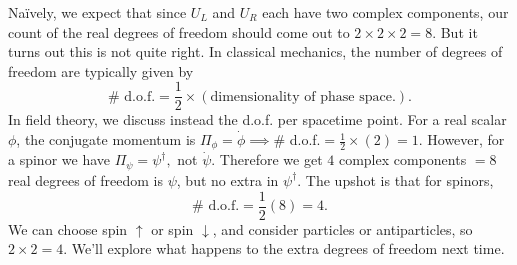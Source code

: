Na\"ively, we expect that since $U_L$ and $U_R$ each have two complex components, our count of the real degrees of freedom should come out to $2\times 2\times 2=8$. But it turns out this is not quite right. In classical mechanics, the number of degrees of freedom are typically given by
$$\#\text{ d.o.f.}=\frac{1}{2}\times(\text{dimensionality of phase space.}).$$
In field theory, we discuss instead the d.o.f. per spacetime point. For a real scalar $\phi$, the conjugate momentum is $\Pi_\phi =\dot\phi \implies$\# d.o.f.$=\frac{1}{2}\times (2)=1$. However, for a spinor we have
$\Pi_\psi = \psi^\dagger,$ not $\dot\psi$. Therefore we get $4$ complex components $=8$ real degrees of freedom is $\psi$, but no extra in $\psi^\dagger$. The upshot is that for spinors,
$$\#\text{ d.o.f.}=\frac{1}{2}(8)=4.$$
We can choose spin $\uparrow$ or spin $\downarrow$, and consider particles or antiparticles, so $2\times 2=4.$ We'll explore what happens to the extra degrees of freedom next time.